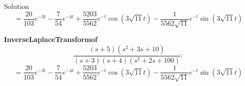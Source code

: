 \documentclass{beamer}
\theoremstyle{remark}
\numberwithin{equation}{section}
\begin{document}
\begin{frame}{Solution}
\begin{equation*}
    =\frac{20}{103}e^{-3t}-\frac{7}{54}e^{-4t}+\frac{5203}{5562}e^{-t}\cos \left(3\sqrt{11}t\right)-\frac{1}{5562\sqrt{11}}e^{-t}\sin \left(3\sqrt{11}t\right)
\end{equation*}


\therefore \textbf{Inverse}\:\textbf{Laplace}\:\textbf{Transform}\:\textbf{of} \\
\begin{equation*}
    \frac{(s+5) (s^2+3s+10)}{(s+3)(s+4)(s^2+2s+100)} :
\end{equation*}
\begin{equation*}
    =\frac{20}{103}e^{-3t}-\frac{7}{54}e^{-4t}+\frac{5203}{5562}e^{-t}\cos \left(3\sqrt{11}t\right)-\frac{1}{5562\sqrt{11}}e^{-t}\sin \left(3\sqrt{11}t\right)
\end{equation*}
\end{frame}
\end{document}
